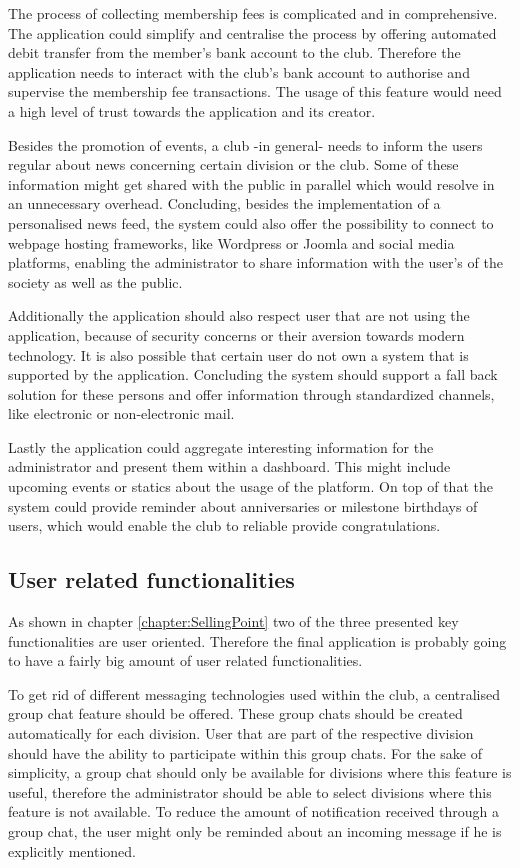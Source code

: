 The process of collecting membership fees is complicated and in comprehensive. The application could simplify and centralise the process by offering automated debit transfer from the member's bank account to the club. Therefore the application needs to interact with the club's bank account to authorise and supervise the membership fee transactions. The usage of this feature would need a high level of trust towards the application and its creator.

Besides the promotion of events, a club -in general- needs to inform the users regular about news concerning certain division or the club. Some of these information might get shared with the public in parallel which would resolve in an unnecessary overhead. Concluding, besides the implementation of a personalised news feed, the system could also offer the possibility to connect to webpage hosting frameworks, like Wordpress or Joomla and social media platforms, enabling the administrator to share information with the user's of the society as well as the public.

Additionally the application should also respect user that are not using the application, because of security concerns or their aversion towards modern technology. It is also possible that certain user do not own a system that is supported by the application. Concluding the system should support a fall back solution for these persons and offer information through standardized channels, like electronic or non-electronic mail.

Lastly the application could aggregate interesting information for the administrator and present them within a dashboard. This might include upcoming events or statics about the usage of the platform. On top of that the system could provide reminder about anniversaries or milestone birthdays of users, which would enable the club to reliable provide congratulations.

\subsection{User related functionalities}

As shown in chapter \vref{chapter:SellingPoint} two of the three presented key functionalities are user oriented. Therefore the final application is probably going to have a fairly big amount of user related functionalities.

To get rid of different messaging technologies used within the club, a centralised group chat feature should be offered. These group chats should be created automatically for each division. User that are part of the respective division should have the ability to participate within this group chats. For the sake of simplicity, a group chat should only be available for divisions where this feature is useful, therefore the administrator should be able to select divisions where this feature is not available. To reduce the amount of notification received through a group chat, the user might only be reminded about an incoming message if he is explicitly mentioned.

